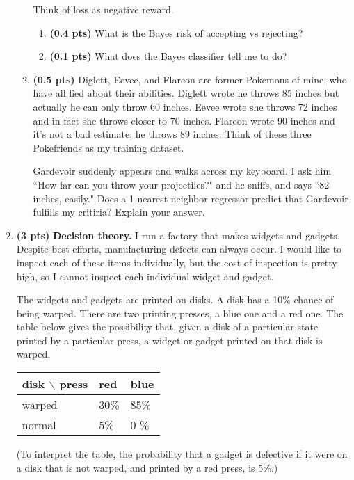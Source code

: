 \documentclass{article}
\newcommand{\showpoints}[1]{\textbf{(#1)}}
\begin{document}
\begin{enumerate}
\begin{enumerate}
Think of loss as negative reward.

\begin{enumerate}
\item  \showpoints{0.4 pts}  What is the Bayes risk of accepting vs rejecting?



\item  \showpoints{0.1 pts}  What does the Bayes classifier tell me to do?


\end{enumerate}

\item  \showpoints{0.5 pts}  Diglett, Eevee, and Flareon are former Pokemons of mine, who have all lied about their abilities. Diglett wrote he throws 85 inches but actually he can only throw 60 inches. Eevee wrote she throws 72 inches and in fact she throws closer to 70 inches. Flareon wrote 90 inches and it's not a bad estimate; he throws 89 inches. Think of these three Pokefriends as my training dataset.

Gardevoir suddenly appears and walks across my keyboard. I ask him ``How far can you throw your projectiles?" and he sniffs, and says ``82 inches, easily."  Does a 1-nearest neighbor regressor predict that Gardevoir fulfills my critiria? Explain your answer. 



\end{enumerate}





\item \showpoints{3 pts} \textbf{Decision theory.} 
I run a factory that makes widgets and gadgets. Despite best efforts, manufacturing defects can always occur. I would like to inspect each of these items individually, but the cost of inspection is pretty high, so I cannot inspect each individual widget and gadget.

The widgets and gadgets are printed on disks. 
A disk has a 10\% chance of being warped. 
There are two printing presses, a blue one and a red one. The table below gives the possibility that, given a disk of a particular state printed by a particular press, a widget or gadget printed on that disk is warped.

\begin{center}
\begin{tabular}{|l|ll|}
\hline
disk $\backslash$ press & red & blue \\
\hline
warped & 30\% & 85\%\\
normal & 5\% & 0 \%\\
\hline
\end{tabular}
\end{center}
(To interpret the table, the probability that a gadget is defective if it were on a disk that is not warped, and printed by a red press, is 5\%.)


\end{enumerate}
\end{document}

